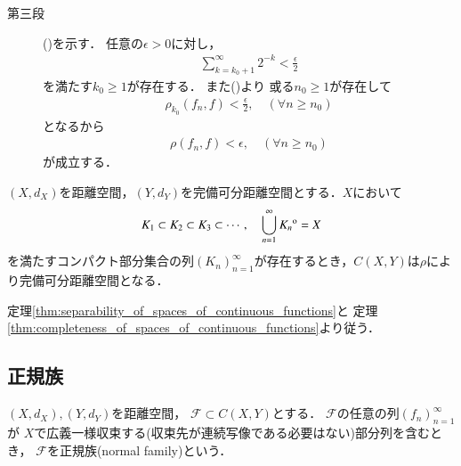 \begin{prf}
\begin{description}
			\item[第三段]
				()を示す．
				任意の$\epsilon > 0$に対し，
				\begin{align}
					\sum_{k=k_0+1}^\infty 2^{-k} < \frac{\epsilon}{2}
				\end{align}
				を満たす$k_0 \geq 1$が存在する．
				また()より
				或る$n_0 \geq 1$が存在して
				\begin{align}
					\rho_{k_0}(f_n,f) < \frac{\epsilon}{2},
					\quad (\forall n \geq n_0)
				\end{align}
				となるから
				\begin{align}
					\rho(f_n,f) < \epsilon, \quad (\forall n \geq n_0)
				\end{align}
				が成立する．
				\QED
		\end{description}
	\end{prf}
	
	\begin{screen}
		\begin{thm}[$C(X,Y)$の完備可分性]\label{thm:appendix_complete_separability_of_spaces_of_continuous_functions}
			$(X,d_X)$を距離空間，$(Y,d_Y)$を完備可分距離空間とする．$X$において
			\begin{align}
				K_1 \subset K_2 \subset K_3 \subset \cdots,
				\quad \bigcup_{n=1}^\infty {\kern0ptK_n}^{\mathrm{o}} = X
			\end{align}
			を満たすコンパクト部分集合の列$(K_n)_{n=1}^\infty$が存在するとき，$C(X,Y)$は$\rho$により完備可分距離空間となる．
		\end{thm}
	\end{screen}
	
	\begin{prf}
		定理\ref{thm:separability_of_spaces_of_continuous_functions}と
		定理\ref{thm:completeness_of_spaces_of_continuous_functions}より従う．
		\QED
	\end{prf}

\subsection{正規族}
	\begin{screen}
		\begin{dfn}[正規族]
			$(X,d_X),(Y,d_Y)$を距離空間，
			$\mathscr{F} \subset C(X,Y)$とする．
			$\mathscr{F}$の任意の列$(f_n)_{n=1}^\infty$が
			$X$で広義一様収束する(収束先が連続写像である必要はない)部分列を含むとき，
			$\mathscr{F}$を正規族(normal family)という．
		\end{dfn}
	\end{screen}
	
